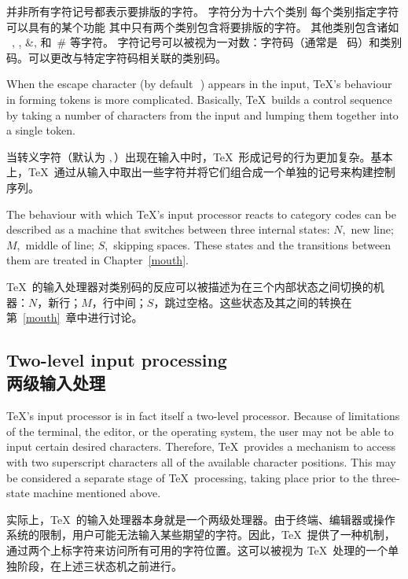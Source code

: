 并非所有字符记号都表示要排版的字符。\altt
字符分为十六个类别 \ldash 每个类别指定字符可以具有的某个功能 \rdash 其中只有两个类别包含将要排版的字符。%
其他类别包含诸如 ~, , \n\&, 和~\n\# 等字符。%
字符记号可以被视为一对数：字符码（通常是 \ascii\ 码）和类别码。可以更改与特定字符码相关联的类别码。

When the escape character (by default~\cs{}$\,$) appears in the input,
\TeX's behaviour in forming tokens is more complicated. 
Basically,
\TeX\ builds a control sequence by taking a number of characters
from the input and lumping them together into a single token.

当转义字符（默认为 \cs{}$,$）出现在输入中时，\TeX\ 形成记号的行为更加复杂。基本上，\TeX\ 通过从输入中取出一些字符并将它们组合成一个单独的记号来构建控制序列。



The behaviour with which \TeX's input processor 
reacts to category codes can be described
as a machine that switches between three internal states:
$N$,~new line; $M$,~middle of line; $S$,~skipping spaces.
These states and the transitions between them are treated
in Chapter~\ref{mouth}.

\TeX\ 的输入处理器对类别码的反应可以被描述为在三个内部状态之间切换的机器：$N$，新行；$M$，行中间；$S$，跳过空格。这些状态及其之间的转换在第~\ref{mouth}~章中进行讨论。



\subsection{Two-level input processing\\两级输入处理}

\TeX's input processor is in fact itself a two-level processor.
Because of limitations of the terminal, the editor, or the operating
\awp
system, the user may not be able to input certain desired characters.
Therefore, \TeX\ provides a mechanism to access
with two superscript characters all of the available character
positions. This may be considered
a separate stage of \TeX\ processing, taking place
prior to the three-state machine mentioned above.

实际上，\TeX\ 的输入处理器本身就是一个两级处理器。由于终端、编辑器或操作系统的限制，用户可能无法输入某些期望的字符。因此，\TeX\ 提供了一种机制，通过两个上标字符来访问所有可用的字符位置。这可以被视为 \TeX\ 处理的一个单独阶段，在上述三状态机之前进行。


